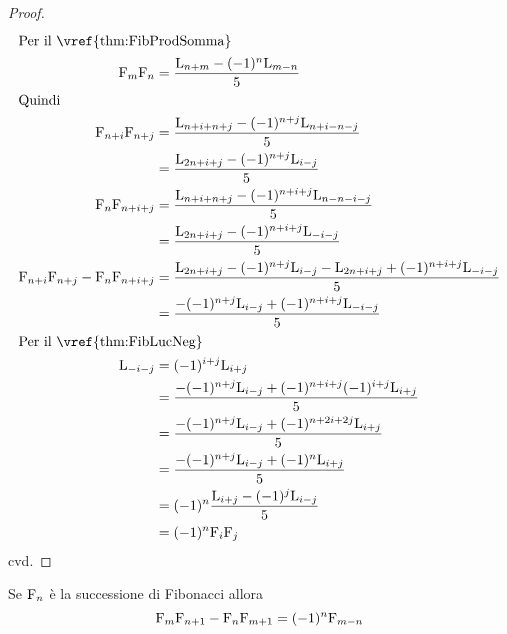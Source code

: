 \begin{proof}
	\begin{align*}
		\intertext{Per il~\vref{thm:FibProdSomma}}
		\Fib{m}\Fib{n}={}                        & \dfrac{\Luc{n+m}-(-1)^n\Luc{m-n}}{5}                                            \\
		\intertext{Quindi}
		\Fib{n+i}\Fib{n+j}={}                    & \dfrac{\Luc{n+i+n+j}-(-1)^{n+j}\Luc{n+i-n-j}}{5}                                \\
		={}                                      & \dfrac{\Luc{2n+i+j}-(-1)^{n+j}\Luc{i-j}}{5}                                     \\
		\Fib{n}\Fib{n+i+j}={}                    & \dfrac{\Luc{n+i+n+j}-(-1)^{n+i+j}\Luc{n-n-i-j}}{5}                              \\
		={}                                      & \dfrac{\Luc{2n+i+j}-(-1)^{n+i+j}\Luc{-i-j}}{5}                                  \\
		\Fib{n+i}\Fib{n+j}-\Fib{n}\Fib{n+i+j}={} & \dfrac{\Luc{2n+i+j}-(-1)^{n+j}\Luc{i-j}-\Luc{2n+i+j}+(-1)^{n+i+j}\Luc{-i-j}}{5} \\
		={}                                      & \dfrac{-(-1)^{n+j}\Luc{i-j}+(-1)^{n+i+j}\Luc{-i-j}}{5}                          \\
		\intertext{Per il~\vref{thm:FibLucNeg}}
		\Luc{-i-j}={}                            & (-1)^{i+j}\Luc{i+j}                                                             \\
		={}                                      & \dfrac{-(-1)^{n+j}\Luc{i-j}+(-1)^{n+i+j}(-1)^{i+j}\Luc{i+j}}{5}                 \\
		={}                                      & \dfrac{-(-1)^{n+j}\Luc{i-j}+(-1)^{n+2i+2j}\Luc{i+j}}{5}                         \\
		={}                                      & \dfrac{-(-1)^{n+j}\Luc{i-j}+(-1)^{n}\Luc{i+j}}{5}                               \\
		={}                                      & (-1)^{n}\dfrac{\Luc{i+j}-(-1)^{j}\Luc{i-j}}{5}                                  \\
		={}                                      & (-1)^{n}\Fib{i}\Fib{j}                                                          \\
	\end{align*}
	cvd.
\end{proof}
\begin{thm}\label{thm:FibdOcagne}
	Se $\mathrm{F}_{n}$ è la successione di Fibonacci allora
	\begin{equation}
		\mathrm{F}_{m}\mathrm{F}_{n+1}-\mathrm{F}_{n}\mathrm{F}_{m+1}=(-1)^n\mathrm{F}_{m-n}
	\end{equation}\label{eqn:FibdOcagne}
\end{thm}
